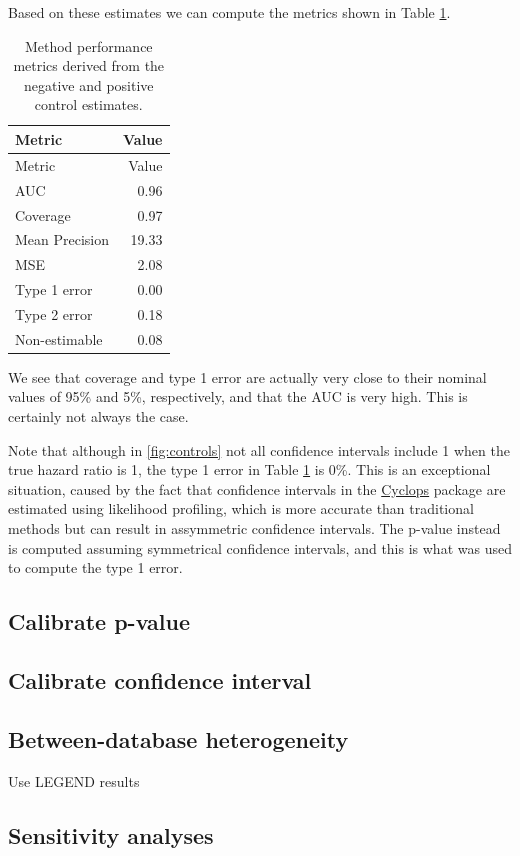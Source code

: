 \documentclass[11pt]{book}
\begin{document}
Based on these estimates we can compute the metrics shown in Table
\ref{tab:exampleMetrics}.

\begin{longtable}[]{@{}lr@{}}
\caption{\label{tab:exampleMetrics} Method performance metrics derived from
the negative and positive control estimates.}\tabularnewline
\toprule
Metric & Value\tabularnewline
\midrule
\endfirsthead
\toprule
Metric & Value\tabularnewline
\midrule
\endhead
AUC & 0.96\tabularnewline
Coverage & 0.97\tabularnewline
Mean Precision & 19.33\tabularnewline
MSE & 2.08\tabularnewline
Type 1 error & 0.00\tabularnewline
Type 2 error & 0.18\tabularnewline
Non-estimable & 0.08\tabularnewline
\bottomrule
\end{longtable}

We see that coverage and type 1 error are actually very close to their
nominal values of 95\% and 5\%, respectively, and that the AUC is very
high. This is certainly not always the case.

Note that although in \ref{fig:controls} not all confidence intervals
include 1 when the true hazard ratio is 1, the type 1 error in Table
\ref{tab:exampleMetrics} is 0\%. This is an exceptional situation,
caused by the fact that confidence intervals in the
\href{https://ohdsi.github.io/Cyclops/}{Cyclops} package are estimated
using likelihood profiling, which is more accurate than traditional
methods but can result in assymmetric confidence intervals. The p-value
instead is computed assuming symmetrical confidence intervals, and this
is what was used to compute the type 1 error.

\subsection{Calibrate p-value}\label{calibrate-p-value}

\subsection{Calibrate confidence
interval}\label{calibrate-confidence-interval}

\subsection{Between-database
heterogeneity}\label{between-database-heterogeneity}

Use LEGEND results

\subsection{Sensitivity analyses}\label{sensitivity-analyses-1}
\end{document}
